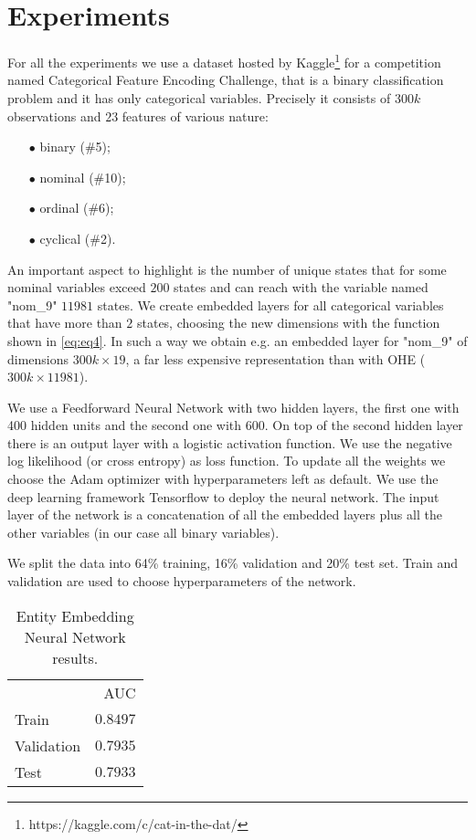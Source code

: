 \documentclass{article}
\begin{document}
\section{Experiments}
For all the experiments we use a dataset hosted by Kaggle\footnote{https://kaggle.com/c/cat-in-the-dat/} for a competition named Categorical Feature Encoding Challenge, that is a binary classification problem and it has only categorical variables. Precisely it consists of $300k$ observations and $23$ features of various nature:
\begin{itemize}[nosep]
    \item[$\bullet$] binary (\#5);
    \item[$\bullet$] nominal (\#10);
    \item[$\bullet$] ordinal (\#6);
    \item[$\bullet$] cyclical (\#2).
\end{itemize}
An important aspect to highlight is the number of unique states that for some nominal variables exceed $200$ states and can reach with the variable named "nom\_9" $11981$ states.
We create embedded layers for all categorical variables that have more than $2$ states, choosing the new dimensions with the function shown in \cref{eq:eq4}. In such a way we obtain e.g. an embedded layer for "nom\_9" of dimensions $300k\times19$, a far less expensive representation than with OHE ($300k\times11981$).

We use a Feedforward Neural Network with two hidden layers, the first one with 400 hidden units and the second one with 600. On top of the second hidden layer there is an output layer with a logistic activation function. We use the negative log likelihood (or cross entropy) as loss function. To update all the weights we choose the Adam\cite{adam} optimizer with hyperparameters left as default. We use the deep learning framework Tensorflow\cite{tf} to deploy the neural network.
The input layer of the network is a concatenation of all the embedded layers plus all the other variables (in our case all binary variables).

We split the data into 64\% training, 16\% validation and 20\% test set.
Train and validation are used to choose hyperparameters of the network.

\begin{table}[h]
  \caption{Entity Embedding Neural Network results.}
  \label{tab:tab1}
  \centering
  \begin{tabular}{lr}
    \toprule
    \multicolumn{2}{r}{AUC} \\
    \cmidrule(r){1-2}
    Train      & $0.8497$      \\
    Validation & $0.7935$     \\
      Test     & $\bm{0.7933}$ \\
    \bottomrule
  \end{tabular}
\end{table}
\end{document}
